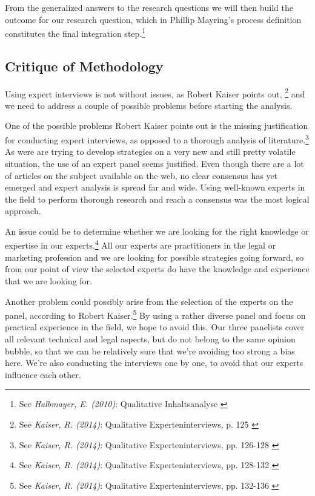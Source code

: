 From the generalized answers to the research questions we will then build the outcome for our research question, which in Phillip Mayring's process definition constitutes the final integration step.\footnote{See \textit{Halbmayer, E. (2010)}: Qualitative Inhaltsanalyse \cite{summaryVienna}}

\subsection{Critique of Methodology}

Using expert interviews is not without issues, as Robert Kaiser points out, \footnote{See \textit{Kaiser, R. (2014)}: Qualitative Experteninterviews, p. 125 \cite{expertInterviews}} and we need to address a couple of possible problems before starting the analysis.

One of the possible problems Robert Kaiser points out is the missing justification for conducting expert interviews, as opposed to a thorough analysis of literature.\footnote{See \textit{Kaiser, R. (2014)}: Qualitative Experteninterviews, pp. 126-128 \cite{expertInterviews}} As were are trying to develop strategies on a very new and still pretty volatile situation, the use of an expert panel seems justified. Even though there are a lot of articles on the subject available on the web, no clear consensus has yet emerged and expert analysis is spread far and wide. Using well-known experts in the field to perform thorough research and reach a consensus was the most logical approach.

An issue could be to determine whether we are looking for the right knowledge or expertise in our experts.\footnote{See \textit{Kaiser, R. (2014)}: Qualitative Experteninterviews, pp. 128-132 \cite{expertInterviews}} All our experts are practitioners in the legal or marketing profession and we are looking for possible strategies going forward, so from our point of view the selected experts do have the knowledge and experience that we are looking for.

Another problem could possibly arise from the selection of the experts on the panel, according to Robert Kaiser.\footnote{See \textit{Kaiser, R. (2014)}: Qualitative Experteninterviews, pp. 132-136 \cite{expertInterviews}} By using a rather diverse panel and focus on practical experience in the field, we hope to avoid this. Our three panelists cover all relevant technical and legal aspects, but do not belong to the same opinion bubble, so that we can be relatively sure that we're avoiding too strong a bias here. We're also conducting the interviews one by one, to avoid that our experts influence each other.

